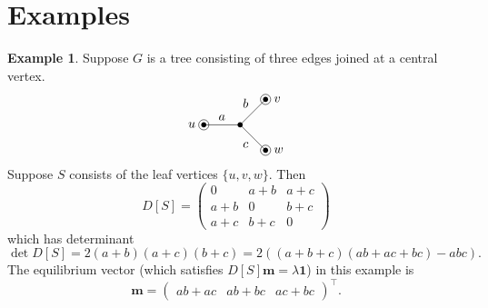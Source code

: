 \documentclass[12pt]{amsart}
\theoremstyle{definition}
\newtheorem{eg}[thm]{Example}
\newcommand{\bone}{\mathbf{1}}
\newcommand{\boldm}{\mathbf{m}}
\newcommand{\tr}{\intercal}
\begin{document}
\section{Examples}
\label{sec:examples}
\begin{eg}
Suppose $G$ is a tree consisting of three edges joined at a central vertex.
\[
\begin{tikzpicture}
	\coordinate (u) at (-1,0);
	\coordinate (v) at (0.7,0.7);
	\coordinate (w) at (0.7,-0.7);
	\coordinate (o) at (0,0);

	\draw (o) -- node[above] {$a$} (u);
	\draw (v) -- node[above left] {$b$} (o)
		-- node[below left] {$c$} (w);

	\foreach \c in {u, v, w, o} {
		\fill (\c) circle (2pt);
	}
	\foreach \c in {u, v, w} {
		\draw (\c) circle (4pt);
	}
	
	\node[left=3pt] at (u) {$u$};
	\node[right=3pt] at (v) {$v$};
	\node[right=3pt] at (w) {$w$};
\end{tikzpicture}
\]
Suppose $S$ consists of the leaf vertices $ \{u,v,w\}$.
Then 
\[
	D[S] = \begin{pmatrix}
	0 & a + b & a + c \\
	a + b & 0 & b + c \\
	a + c & b + c & 0
	\end{pmatrix}
\]
which has determinant
\[\det D[S] = 2(a+b)(a+c)(b+c) 
	= 2\left( (a+b+c)(ab + ac + bc) - abc \right).
\]
The equilibrium vector (which satisfies $D[S] \boldm = \lambda \bone$) in this example is 
\[
	\boldm = \begin{pmatrix} 
	ab + ac & 
	ab + bc &
	ac + bc 
	\end{pmatrix}^\tr.
\]
\end{eg}
\end{document}
